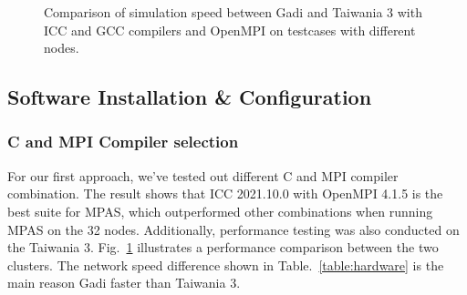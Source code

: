 \begin{figure}[t]
\centering
{}
\caption{Comparison of simulation speed between Gadi and Taiwania 3 with ICC and GCC compilers and OpenMPI on testcases with different nodes.}
\label{fig:compare-compiler}
\end{figure}

\subsection{Software Installation \& Configuration}
\subsubsection{C and MPI Compiler selection}
For our first approach, we've tested out different C and MPI compiler combination. The result shows that ICC 2021.10.0 with OpenMPI 4.1.5 is the best suite for MPAS, which outperformed other combinations when running MPAS on the 32 nodes. Additionally, performance testing was also conducted on the Taiwania 3. Fig.~\ref{fig:compare-compiler} illustrates a performance comparison between the two clusters. The network speed difference shown in Table.~\ref{table:hardware} is the main reason Gadi faster than Taiwania 3.

